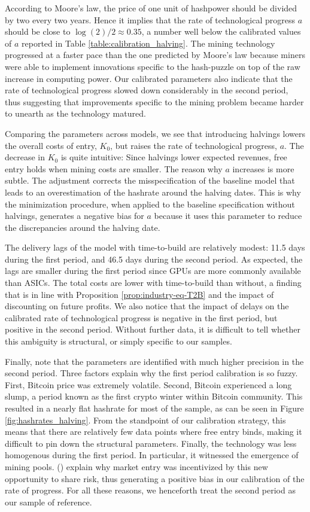 \documentclass[12pt, a4paper]{article}
\begin{document}
According to Moore's law, the price of one unit of hashpower should be divided by two
every two years. Hence it implies that the rate of technological progress
$a$ should be close to $\log(2)/2\approx0.35$, a number well below the calibrated values of $a$ reported in Table \ref{table:calibration_halving}.
The mining technology
progressed at a faster pace than the one predicted by Moore's law because miners
were able to implement innovations specific to the hash-puzzle on top of
the raw increase in computing power. Our calibrated parameters also indicate
that the rate of technological progress slowed down considerably in the
second period, thus suggesting that improvements specific to the mining problem became harder to
unearth as the technology matured.

Comparing the parameters across models, we see that introducing halvings
lowers the overall costs of entry, $K_{0}$,
but raises the rate of technological progress, $a$. The decrease
in $K_{0}$ is quite intuitive: Since halvings lower expected revenues,
free entry holds when mining costs are smaller. The reason why $a$
increases is more subtle. The adjustment corrects the
misspecification of the baseline model that leads to an overestimation of the
hashrate around the halving dates. This is why the minimization procedure,
when applied to the baseline specification without halvings, generates a
negative bias for $a$ because it uses this parameter to reduce the discrepancies
around the halving date.

The delivery lags of the model with time-to-build are
relatively modest: 11.5 days during the first period, and 46.5 days
during the second period.
As expected, the lags are smaller during the first period since GPUs are more commonly available than ASICs. The total costs are lower
with time-to-build than without, a finding that is in line with Proposition \ref{prop:industry-eq-T2B} and the impact of discounting on future profits.
We also notice that the impact of delays on the calibrated rate of technological progress is negative in the first period, but positive in the second period.
Without further data, it is difficult to tell whether this ambiguity is structural, or simply specific to our samples.

Finally, note that the parameters are identified with much higher precision in the second period. Three factors explain why the first period calibration
is so fuzzy. First, Bitcoin price was extremely volatile. Second, Bitcoin experienced a long slump, a period known as the first crypto winter within
Bitcoin community. This resulted in a nearly flat hashrate for most of the sample, as can be seen in Figure \ref{fig:hashrates_halving}.
From the standpoint of our calibration strategy, this means that there are relatively few data points where free entry binds, making it
difficult to pin down the structural parameters. Finally, the technology was less homogenous during the first period.
In particular, it witnessed the emergence of mining pools. \citeauthor{Cong2018} (\citeyear{Cong2018})
explain why market entry was incentivized by this new opportunity to share risk, thus generating a positive bias in our calibration
of the rate of progress.
For all these reasons, we henceforth treat the second period as our sample of reference.
\end{document}
